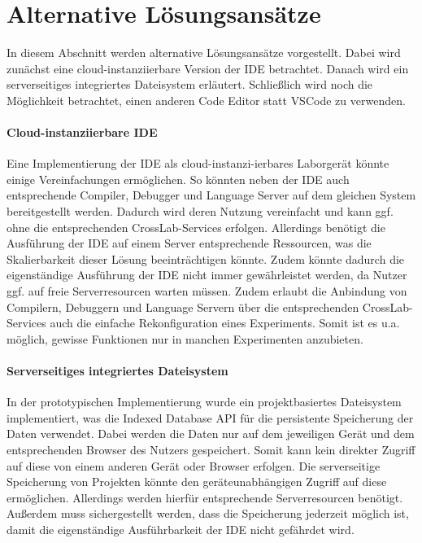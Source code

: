 \section{Alternative Lösungsansätze}\label{section:diskussion:alternative-lösungsansätze}

In diesem Abschnitt werden alternative Lösungsansätze vorgestellt. Dabei wird zunächst eine cloud-instanziierbare Version der IDE betrachtet. Danach wird ein serverseitiges integriertes Dateisystem erläutert. Schließlich wird noch die Möglichkeit betrachtet, einen anderen Code Editor statt \ac{VSCode} zu verwenden.

\paragraph{Cloud-instanziierbare IDE}
Eine Implementierung der IDE als cloud-instanzi-ierbares Laborgerät könnte einige Vereinfachungen ermöglichen. So könnten neben der IDE auch entsprechende Compiler, Debugger und Language Server auf dem gleichen System bereitgestellt werden. Dadurch wird deren Nutzung vereinfacht und kann ggf. ohne die entsprechenden CrossLab-Services erfolgen. Allerdings benötigt die Ausführung der IDE auf einem Server entsprechende Ressourcen, was die Skalierbarkeit dieser Lösung beeinträchtigen könnte. Zudem könnte dadurch die eigenständige Ausführung der IDE nicht immer gewährleistet werden, da Nutzer ggf. auf freie Serverresourcen warten müssen. Zudem erlaubt die Anbindung von Compilern, Debuggern und Language Servern über die entsprechenden CrossLab-Services auch die einfache Rekonfiguration eines Experiments. Somit ist es u.a. möglich, gewisse Funktionen nur in manchen Experimenten anzubieten.

\paragraph{Serverseitiges integriertes Dateisystem}
In der prototypischen Implementierung wurde ein projektbasiertes Dateisystem implementiert, was die Indexed Database API für die persistente Speicherung der Daten verwendet. Dabei werden die Daten nur auf dem jeweiligen Gerät und dem entsprechenden Browser des Nutzers gespeichert. Somit kann kein direkter Zugriff auf diese von einem anderen Gerät oder Browser erfolgen. Die serverseitige Speicherung von Projekten könnte den geräteunabhängigen Zugriff auf diese ermöglichen. Allerdings werden hierfür entsprechende Serverresourcen benötigt. Außerdem muss sichergestellt werden, dass die Speicherung jederzeit möglich ist, damit die eigenständige Ausführbarkeit der IDE nicht gefährdet wird.

